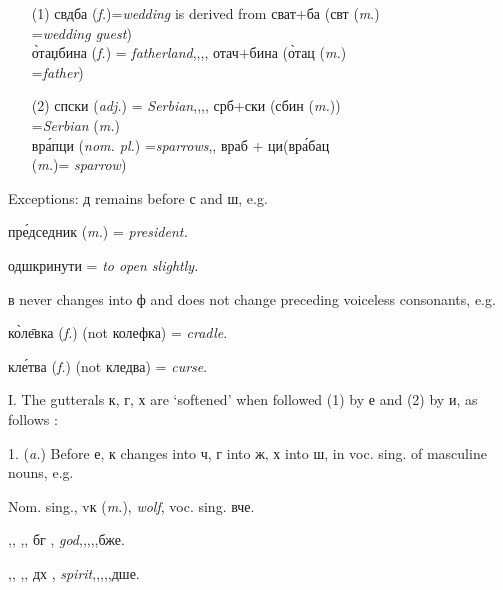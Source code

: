\begin{itemize}
    \item[(1)] свдба (\emph{f.})=\emph{wedding} is derived
        from сват+ба (свт (\emph{m}.)\\
        \hspace*{3in}=\emph{wedding guest})\\
        \`{о}таџбина ({\it f.}) = \textit{fatherland}\quad ,,\qquad,, \quad
        отач+бина (\`{о}тац ({\it m.})\\
        \hspace*{3in}=\emph{father})  
    \item[(2)] спски ({\it adj.}) =
        \emph{Serbian}\qquad,,\qquad,, \quad 
        срб+ски (сбин ({\it m.}))\\
        \hspace*{3in}=\emph{Serbian} ({\it m.})\\
        вр\'{а}пци ({\it nom. pl.}) =\emph{sparrows}\qquad,, \quad
        враб + ци\quad(вр\'{а}бац\\
        \hspace*{3in}({\it m.})= \emph{sparrow})
\end{itemize}

Exceptions: д remains before с and ш, e.g.

\qquad\qquad пр\'{е}дседник ({\it m.}) = \emph{president.}

\qquad\qquad одшкринути = \emph{to open slightly.}

в never changes into ф and does not change preceding voiceless consonants, e.g.

\qquad\qquad к\`{о}л\={е}вка ({\it f.}) (not колефка) = \textit{cradle}.

\qquad\qquad кл\'{е}тва ({\it f.}) (not кледва) = \textit{curse}.


I. The gutterals к, г, х are `softened' when followed (1) by е and (2) by и, as follows :
\newpage

1. ({\it a.}) Before е, к changes into ч, г into ж, х into ш, in voc. sing. of masculine nouns, e.g.

Nom. sing., vк ({\it m.}), \emph{wolf}, voc. sing. вче.

\quad,, \quad ,, \qquad бг \masc, \emph{god},\qquad,,\quad,,\quad бже.

\quad,, \quad ,, \qquad дх \masc, \emph{spirit},\quad,,\quad,,\quad дше.

